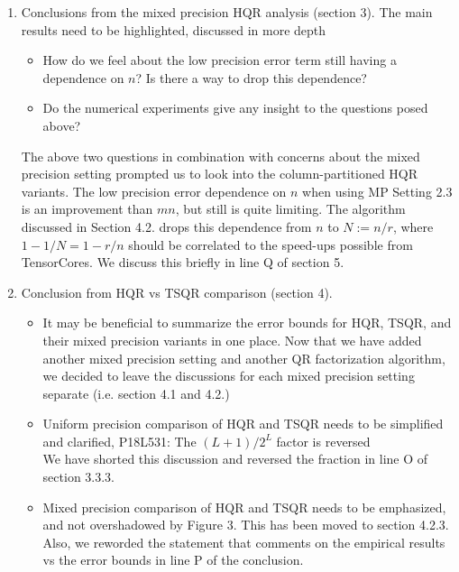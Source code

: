 \documentclass[10pt]{article}
\begin{document}
\begin{enumerate}
	\item Conclusions from the mixed precision HQR analysis (section 3). 
	The main results need to be highlighted, discussed in more depth
	\begin{itemize}\bfseries
		\item How do we feel about the low precision error term still having a dependence on $n$? Is there a way to drop this dependence?
		\item Do the numerical experiments give any insight to the questions posed above?
	\end{itemize}
{\normalfont The above two questions in combination with concerns about the mixed precision setting prompted us to look into the column-partitioned HQR variants. 
The low precision error dependence on $n$ when using MP Setting 2.3 is an improvement than $mn$, but still is quite limiting. 
The algorithm discussed in Section 4.2. drops this dependence from $n$ to $N:=n/r$, where $1-1/N = 1-r/n$ should be correlated to the speed-ups possible from TensorCores. 
We discuss this briefly in line Q of section 5. }
	\item Conclusion from HQR vs TSQR comparison (section 4).
	\begin{itemize}\bfseries
		\item It may be beneficial to summarize the error bounds for HQR, TSQR, and their mixed precision variants in one place. 
		{\normalfont
			Now that we have added another mixed precision setting and another QR factorization algorithm, we decided to leave the discussions for each mixed precision setting separate (i.e. section 4.1 and 4.2.)
		}
		\item Uniform precision comparison of HQR and TSQR needs to be simplified and clarified,  P18L531: The $(L+1)/2^L$ factor is reversed\\
		{\normalfont
			We have shorted this discussion and reversed the fraction in line O of section 3.3.3. 
		}
		\item Mixed precision comparison of HQR and TSQR needs to be emphasized, and not overshadowed by Figure 3. 
		{\normalfont This has been moved to section 4.2.3. Also, we reworded the statement that comments on the empirical results vs the error bounds in line P of the conclusion.}
	\end{itemize}
	

\end{enumerate}
\end{document}

